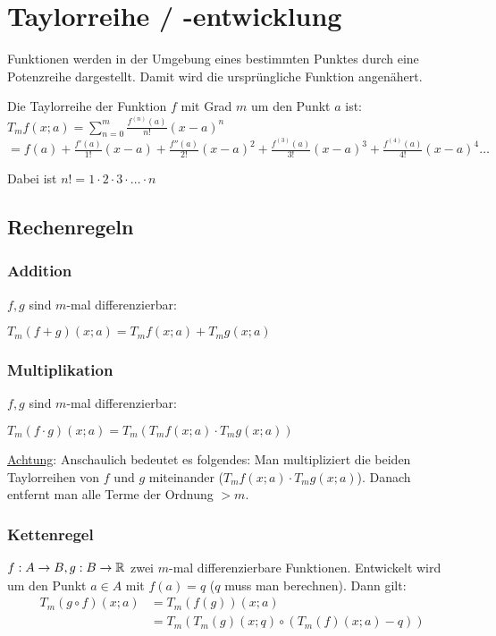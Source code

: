 \section{Taylorreihe / -entwicklung}
Funktionen werden in der Umgebung eines bestimmten Punktes durch eine
Potenzreihe dargestellt. Damit wird die ursprüngliche Funktion angenähert.

Die Taylorreihe der Funktion $f$ mit Grad $m$ um den Punkt $a$ ist:
$T_m f(x;a) = \sum_{n = 0}^m \frac{f^{(n)}(a)}{n!}(x - a)^n$\newline
{\small
$= f(a) + \frac{f'(a)}{1!}(x-a) + \frac{f''(a)}{2!}(x-a)^2 +
\frac{f^{(3)}(a)}{3!}(x-a)^3 + \frac{f^{(4)}(a)}{4!}(x-a)^4\ldots$
}

Dabei ist $n! = 1 \cdot 2 \cdot 3 \cdot \ldots \cdot n$

\subsection{Rechenregeln}
\subsubsection{Addition}
$f, g$ sind $m$-mal differenzierbar:

$T_m (f + g)(x;a) = T_m f(x;a) + T_m g(x;a)$

\subsubsection{Multiplikation}
$f, g$ sind $m$-mal differenzierbar:

$T_m (f \cdot g)(x;a) = T_m(T_m f(x;a) \cdot T_m g(x;a))$

\underline{Achtung}: Anschaulich bedeutet es folgendes: Man
multipliziert die beiden Taylorreihen von $f$ und $g$ miteinander ($T_m f(x;a) \cdot T_m g(x;a)$).
Danach entfernt man alle Terme der Ordnung $> m$.

\subsubsection{Kettenregel}
$f: A \to B, g: B \to \mathbb{R}$ zwei $m$-mal differenzierbare Funktionen.
Entwickelt wird um den Punkt $a \in A$ mit $f(a) = q$ ($q$ muss man berechnen).
Dann gilt:
\begin{align*}
T_m (g \circ f)(x;a) &= T_m (f(g))(x;a)\\
&= T_m(T_m(g)(x;q) \circ (T_m(f)(x;a) - q))
\end{align*}

